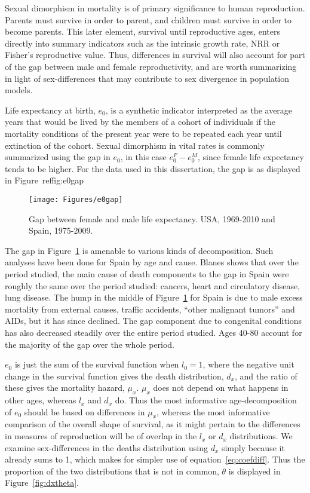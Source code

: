  \FloatBarrier
Sexual dimorphism in mortality is of primary significance to human reproduction.
Parents must survive in order to parent, and children must survive in order to
become parents. This later element, survival until reproductive ages, enters
directly into summary indicators such as the intrinsic growth rate, NRR or
Fisher's reproductive value. Thus, differences in survival will also account for
part of the gap between male and female reproductivity, and are worth summarizing 
in light of sex-differences
that may contribute to sex divergence in population models.

Life expectancy at birth, $e_0$, is a synthetic indicator interpreted as the
average years that would be lived by the members of a cohort of individuals if
the mortality conditions of the present year were to be repeated each year until extinction of
the cohort. Sexual dimorphism in vital rates is commonly summarized using the
gap in $e_0$, in this case $e_0^F - e_0^M$, since female life expectancy tends
to be higher. For the data used in this dissertation, the gap is as displayed in
Figure~ref{fig:e0gap}

\begin{figure}[!ht]
  \centering
    \caption{Gap between female and male life expectancy. USA,
    1969-2010 and Spain, 1975-2009.}
     \texttt{[image: Figures/e0gap]}
     \label{fig:e0gap}
\end{figure}

The gap in Figure~\ref{fig:e0gap} is amenable to various kinds of decomposition.
Such analyses have been done for Spain by age and cause\citep[pp 217-218 and
447]{amand2007thesis}. Blanes shows that over the period studied, the main cause of death components to the
gap in Spain were roughly the same over the period studied: cancers, heart
and circulatory disease, lung disease. The hump in the middle of
Figure~\ref{fig:e0gap} for Spain is due to male excess mortality from external
causes, traffic accidents, ``other malignant tumors'' and AIDs, but it has
since declined. The gap component due to congenital conditions has also
decreased steadily over the entire period studied. Ages 40-80 account for the
majority of the gap over the whole period.


$e_0$ is just the sum of the survival function when $l_0 = 1$, where the
negative unit change in the survival function gives the death distribution,
$d_x$, and the ratio of these gives the mortality hazard, $\mu _x$. $\mu_x$ does
not depend on what happens in other ages, whereas $l_x$ and $d_x$ do. Thus the
most informative age-decomposition of $e_0$ should be based on differences in
$\mu _x$, whereas the most informative comparison of the overall shape of
survival, as it might pertain to the differences in measures of reproduction
will be of overlap in the $l_x$ or $d_x$ distributions. We examine
sex-differences in the deaths distribution using $d_x$ simply
because it already sums to 1, which makes for simpler use of
equation~\eqref{eq:coefdiff}. Thus the proportion of the two distributions that
is not in common, $\theta$ is displayed in Figure~\ref{fig:dxtheta}.

